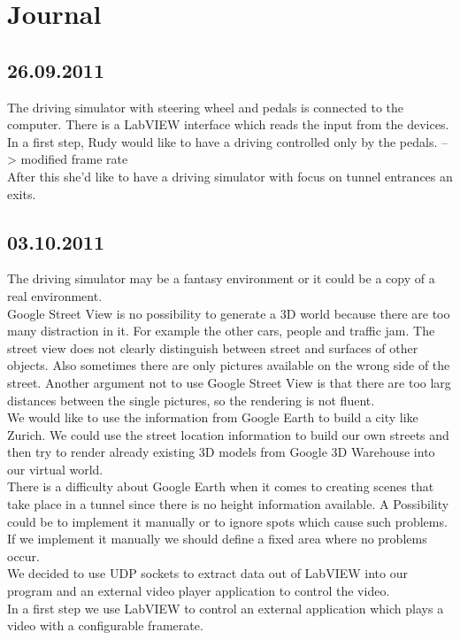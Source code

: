 \section{Journal}
\subsection*{26.09.2011}
The driving simulator with steering wheel and pedals is connected to the computer. There is a LabVIEW interface which reads the input from the devices. In a first step, Rudy would like to have a driving controlled only by the pedals. --> modified frame rate \\
After this she'd like to have a driving simulator with focus on tunnel entrances an exits.  
\subsection*{03.10.2011}
The driving simulator may be a fantasy environment or it could be a copy of a real environment. \\
Google Street View is no possibility to generate a 3D world because there are too many distraction in it. For example the other cars, people and traffic jam. The street view does not clearly distinguish between street and surfaces of other objects. Also sometimes there are only pictures available on the wrong side of the street. Another argument not to use Google Street View is that there are too larg distances between the single pictures, so the rendering is not fluent.\\
We would like to use the information from Google Earth to build a city like Zurich. We could use the street location information to build our own streets and then try to render already existing 3D models from Google 3D Warehouse into our virtual world. \\
There is a difficulty about Google Earth when it comes to creating scenes that take place in a tunnel since there is no height information available. A Possibility could be to implement it manually or to ignore spots which cause such problems. If we implement it manually we should define a fixed area where no problems occur. \\
We decided to use UDP sockets to extract data out of LabVIEW into our program and an external video player application to control the video.\\
In a first step we use LabVIEW to control an external application which plays a video with a configurable framerate. 
